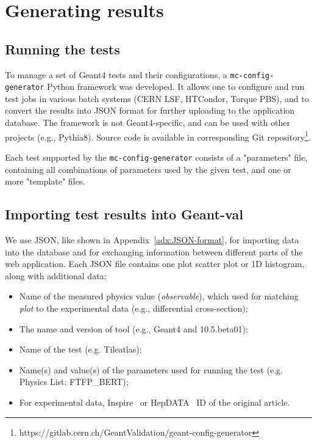 


\section{Generating results}

\subsection{Running the tests}

To manage a set of Geant4 tests and their configurations, a {\tt mc-config-generator} Python framework was developed. It allows one to configure and run test jobs in various batch systems (CERN LSF, HTCondor, Torque PBS), and to convert the results into  JSON format for further uploading to the application database. The framework is not Geant4-specific, and can be used with other projects (e.g., Pythia8). Source code is available in corresponding Git repository\footnote{https://gitlab.cern.ch/GeantValidation/geant-config-generator}.

Each test supported by the {\tt mc-config-generator} consists of a "parameters" file, containing all combinations of parameters used by the given test, and one or more "template" files.

\subsection{Importing test results into Geant-val}

We use JSON, like shown in Appendix~\ref{adx:JSON-format}, for importing data into the database and for exchanging information between different parts of the web application. Each JSON file contains one plot scatter plot or 1D histogram, along with additional data:

\begin{itemize}
    \item Name of the measured physics value (\textit{observable}), which used for matching \textit{plot} to the experimental data (e.g., differential cross-section);
    \item The name and version of tool (e.g., Geant4 and 10.5.beta01);
    \item Name of the test (e.g. Tileatlas);
    \item Name(s) and value(s) of the parameters used for running the test (e.g. Physics List: FTFP\_BERT);
    \item For experimental data, Inspire~\cite{inspire} or HepDATA~\cite{hepdata} ID of the original article.
\end{itemize}

